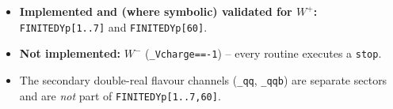 \documentclass[11pt]{article}
\newcommand{\code}[1]{\texttt{#1}}
\begin{document}
\begin{itemize}
\item \textbf{Implemented and (where symbolic) validated for $W^+$:} \code{FINITEDYp[1..7]} and
  \code{FINITEDYp[60]}.
\item \textbf{Not implemented:} $W^-$ (\code{\_Vcharge==-1}) -- every routine executes a
  \code{stop}.
\item The secondary double-real flavour channels (\code{\_qq}, \code{\_qqb}) are separate
  sectors and are \emph{not} part of \code{FINITEDYp[1..7,60]}.
\end{itemize}
\end{document}
